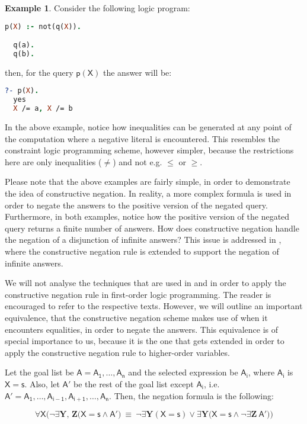 \documentclass[inscr,ack,preface]{dithesis}
\theoremstyle{definition}
\newtheorem{example}{Example}[chapter]
\newcommand{\msf}[1]{$\mathsf{#1}$}
\begin{document}
\begin{example} Consider the following logic program:
\begin{lstlisting}[language=Prolog,frame=single]
  p(X) :- not(q(X)).

  q(a).
  q(b).
\end{lstlisting}
then, for the query \msf{p(X)} the answer will be:
\begin{lstlisting}[language=Prolog,frame=single]
  ?- p(X).
  yes
  X /= a, X /= b
\end{lstlisting}
\end{example}

In the above example, notice how inequalities can be generated at any point of the computation where a negative literal is encountered. This resembles the constraint logic programming scheme, however simpler, because the restrictions here are only inequalities (\msf{\ne}) and not e.g. \msf{\le} or \msf{\ge}.

Please note that the above examples are fairly simple, in order to demonstrate the idea of constructive negation. In reality, a more complex formula is used in order to negate the answers to the positive version of the negated query. Furthermore, in both examples, notice how the positive version of the negated query returns a finite number of answers. How does constructive negation handle the negation of a disjunction of infinite answers? This issue is addressed in \cite{DBLP:conf/slp/Chan89}, where the constructive negation rule is extended to support the negation of infinite answers.

We will not analyse the techniques that are used in \cite{DBLP:conf/iclp/Chan88} and \cite{DBLP:conf/slp/Chan89} in order to apply the constructive negation rule in first-order logic programming. The reader is encouraged to refer to the respective texts. However, we will outline an important equivalence, that the constructive negation scheme makes use of when it encounters equalities, in order to negate the answers. This equivalence is of special importance to us, because it is the one that gets extended in order to apply the constructive negation rule to higher-order variables.

Let the goal list be \msf{A = A_1, \ldots, A_n} and the selected expression be \msf{A_i}, where \msf{A_i} is \msf{X=s}. Also, let \msf{A'} be the rest of the goal list except \msf{A_i}, i.e. \msf{A' = A_1, \ldots, A_{i-1}, A_{i+1}, \ldots, A_{n}}. Then, the negation formula is the following:

\begin{equation}\label{eq:cneg}
  \forall \mathsf{X} \Big(
    \lnot\exists \textbf{Y, Z} \big( \mathsf{X=s} \land \mathsf{A'} \big) ~\equiv~
    \lnot\exists \textbf{Y} \left(\mathsf{X=s}\right) \lor \exists \textbf{Y} \big( \mathsf{X=s} \land \lnot\exists \textbf{Z} ~ \mathsf{A'} \big)
  \Big)
\end{equation}
\end{document}
